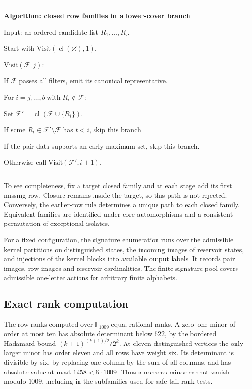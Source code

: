 \documentclass[11pt]{article}
\theoremstyle{definition}
\theoremstyle{plain}
\begin{document}
\begin{center}
\begin{minipage}{.94\linewidth}
\hrule\smallskip
\textbf{Algorithm: closed row families in a lower-cover branch}\par
Input: an ordered candidate list $R_1,\ldots,R_b$.\par
Start with $\mathrm{Visit}(\operatorname{cl}(\varnothing),1)$.\par
$\mathrm{Visit}(\mathcal F,j)$:\par
\quad If $\mathcal F$ passes all filters, emit its canonical representative.\par
\quad For $i=j,\ldots,b$ with $R_i\notin\mathcal F$:\par
\qquad Set $\mathcal F'=\operatorname{cl}(\mathcal F\cup\{R_i\})$.\par
\qquad If some $R_t\in\mathcal F'\setminus\mathcal F$ has $t<i$, skip this branch.\par
\qquad If the pair data supports an early maximum set, skip this branch.\par
\qquad Otherwise call $\mathrm{Visit}(\mathcal F',i+1)$.\par
\smallskip\hrule
\end{minipage}
\end{center}

To see completeness, fix a target closed family and at each stage add
its first missing row. Closure remains inside the target, so this path
is not rejected. Conversely, the earlier-row rule determines a unique
path to each closed family. Equivalent families are identified under
core automorphisms and a consistent permutation of exceptional isolates.

For a fixed configuration, the signature enumeration runs over the
admissible kernel partitions on distinguished states, the incoming images of
reservoir states, and injections of the kernel blocks into available
output labels. It records pair images, row images and reservoir
cardinalities. The finite signature pool covers admissible one-letter
actions for arbitrary finite alphabets.

\subsection{Exact rank computation}
The row ranks computed over $\mathbb F_{1009}$ equal rational ranks.
A zero--one minor of order at most ten has absolute determinant below
$522$, by the bordered Hadamard bound
$(k+1)^{(k+1)/2}/2^k$. At eleven distinguished vertices the only larger minor
has order eleven and all rows have weight six. Its determinant is
divisible by six, by replacing one column by the sum of all columns,
and has absolute value at most $1458<6\cdot1009$.
Thus a nonzero minor cannot vanish modulo $1009$, including in the
subfamilies used for safe-tail rank tests.
\end{document}
